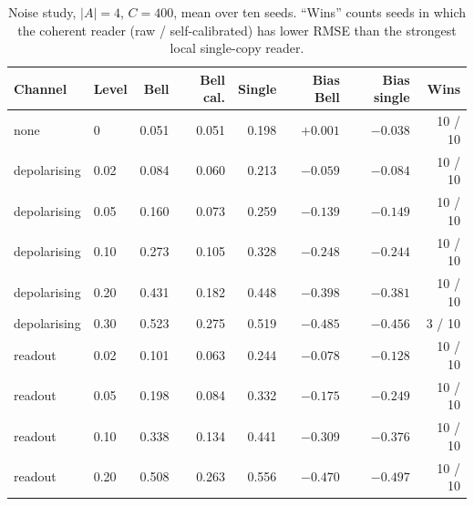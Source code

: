 \documentclass[11pt,a4paper]{article}
\begin{document}
\begin{table}[H]
\centering
\small
\caption{Noise study, $|A|=4$, $C=400$, mean over ten seeds. ``Wins'' counts seeds in which the
coherent reader (raw / self-calibrated) has lower RMSE than the strongest local single-copy reader.}
\label{tab:noise}
\setlength{\tabcolsep}{4pt}
\begin{tabular}{llrrrrrr}
\toprule
Channel & Level & Bell & Bell cal. & Single & Bias Bell & Bias single & Wins \\
\midrule
none & 0 & 0.051 & 0.051 & 0.198 & $+0.001$ & $-0.038$ & 10 / 10 \\
depolarising & 0.02 & 0.084 & 0.060 & 0.213 & $-0.059$ & $-0.084$ & 10 / 10 \\
depolarising & 0.05 & 0.160 & 0.073 & 0.259 & $-0.139$ & $-0.149$ & 10 / 10 \\
depolarising & 0.10 & 0.273 & 0.105 & 0.328 & $-0.248$ & $-0.244$ & 10 / 10 \\
depolarising & 0.20 & 0.431 & 0.182 & 0.448 & $-0.398$ & $-0.381$ & 10 / 10 \\
depolarising & 0.30 & 0.523 & 0.275 & 0.519 & $-0.485$ & $-0.456$ & 3 / 10 \\
readout & 0.02 & 0.101 & 0.063 & 0.244 & $-0.078$ & $-0.128$ & 10 / 10 \\
readout & 0.05 & 0.198 & 0.084 & 0.332 & $-0.175$ & $-0.249$ & 10 / 10 \\
readout & 0.10 & 0.338 & 0.134 & 0.441 & $-0.309$ & $-0.376$ & 10 / 10 \\
readout & 0.20 & 0.508 & 0.263 & 0.556 & $-0.470$ & $-0.497$ & 10 / 10 \\
\bottomrule
\end{tabular}
\end{table}
\end{document}
